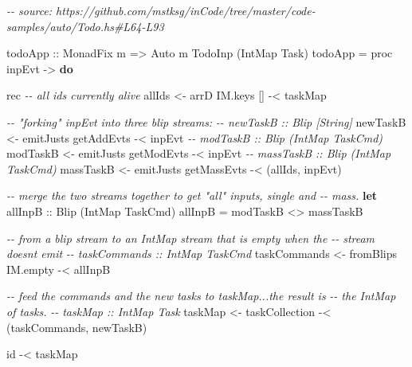\documentclass[]{article}
\newenvironment{Shaded}{}{}
\newcommand{\CommentTok}[1]{\textcolor[rgb]{0.38,0.63,0.69}{\textit{#1}}}
\newcommand{\DataTypeTok}[1]{\textcolor[rgb]{0.56,0.13,0.00}{#1}}
\newcommand{\FunctionTok}[1]{\textcolor[rgb]{0.02,0.16,0.49}{#1}}
\newcommand{\KeywordTok}[1]{\textcolor[rgb]{0.00,0.44,0.13}{\textbf{#1}}}
\newcommand{\NormalTok}[1]{#1}
\newcommand{\OperatorTok}[1]{\textcolor[rgb]{0.40,0.40,0.40}{#1}}
\newcommand{\OtherTok}[1]{\textcolor[rgb]{0.00,0.44,0.13}{#1}}
\begin{document}
\begin{Shaded}
\begin{Highlighting}[]
\CommentTok{{-}{-} source: https://github.com/mstksg/inCode/tree/master/code{-}samples/auto/Todo.hs\#L64{-}L93}

\OtherTok{todoApp ::} \DataTypeTok{MonadFix}\NormalTok{ m }\OtherTok{=>} \DataTypeTok{Auto}\NormalTok{ m }\DataTypeTok{TodoInp}\NormalTok{ (}\DataTypeTok{IntMap} \DataTypeTok{Task}\NormalTok{)}
\NormalTok{todoApp }\OtherTok{=}\NormalTok{ proc inpEvt }\OtherTok{{-}>} \KeywordTok{do}

\NormalTok{    rec }\CommentTok{{-}{-} all id\textquotesingle{}s currently alive}
\NormalTok{        allIds }\OtherTok{<{-}}\NormalTok{ arrD IM.keys [] }\OperatorTok{{-}<}\NormalTok{ taskMap}

        \CommentTok{{-}{-} "forking" \textasciigrave{}inpEvt\textasciigrave{} into three blip streams:}
        \CommentTok{{-}{-} newTaskB :: Blip [String]}
\NormalTok{        newTaskB  }\OtherTok{<{-}}\NormalTok{ emitJusts getAddEvts  }\OperatorTok{{-}<}\NormalTok{ inpEvt}
        \CommentTok{{-}{-} modTaskB :: Blip (IntMap TaskCmd)}
\NormalTok{        modTaskB  }\OtherTok{<{-}}\NormalTok{ emitJusts getModEvts  }\OperatorTok{{-}<}\NormalTok{ inpEvt}
        \CommentTok{{-}{-} massTaskB :: Blip (IntMap TaskCmd)}
\NormalTok{        massTaskB }\OtherTok{<{-}}\NormalTok{ emitJusts getMassEvts }\OperatorTok{{-}<}\NormalTok{ (allIds, inpEvt)}

        \CommentTok{{-}{-} merge the two streams together to get "all" inputs, single and}
        \CommentTok{{-}{-} mass.}
        \KeywordTok{let}\OtherTok{ allInpB ::} \DataTypeTok{Blip}\NormalTok{ (}\DataTypeTok{IntMap} \DataTypeTok{TaskCmd}\NormalTok{)}
\NormalTok{            allInpB }\OtherTok{=}\NormalTok{ modTaskB }\OperatorTok{<>}\NormalTok{ massTaskB}

        \CommentTok{{-}{-} from a blip stream to an \textasciigrave{}IntMap\textasciigrave{} stream that is empty when the}
        \CommentTok{{-}{-} stream doesn\textquotesingle{}t emit}
        \CommentTok{{-}{-} taskCommands :: IntMap TaskCmd}
\NormalTok{        taskCommands }\OtherTok{<{-}}\NormalTok{ fromBlips IM.empty }\OperatorTok{{-}<}\NormalTok{ allInpB}

        \CommentTok{{-}{-} feed the commands and the new tasks to \textasciigrave{}taskMap\textasciigrave{}...the result is}
        \CommentTok{{-}{-} the \textasciigrave{}IntMap\textasciigrave{} of tasks.}
        \CommentTok{{-}{-} taskMap :: IntMap Task}
\NormalTok{        taskMap }\OtherTok{<{-}}\NormalTok{ taskCollection }\OperatorTok{{-}<}\NormalTok{ (taskCommands, newTaskB)}

    \FunctionTok{id} \OperatorTok{{-}<}\NormalTok{ taskMap}
\end{Highlighting}
\end{Shaded}
\end{document}

